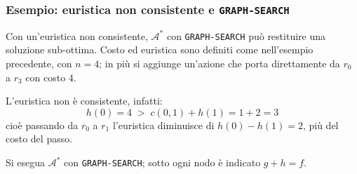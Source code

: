 \documentclass[a4paper, 11pt, oneside]{book}
\theoremstyle{definition}
\begin{document}
    \subsubsection*{Esempio: euristica non consistente e \texttt{GRAPH-SEARCH}}
    Con un'euristica non consistente, $\mathcal{A}^*$ con \texttt{GRAPH-SEARCH} pu\`o
    restituire una soluzione sub-ottima. Costo ed euristica sono definiti come
    nell'esempio precedente, con $n = 4$; in pi\`u si aggiunge un'azione che porta direttamente
    da $r_0$ a $r_3$ con costo 4.

    \begin{center}
    \end{center}

    L'euristica non \`e consistente, infatti:
    \[
        h(0) = 4 \;>\; c(0, 1) + h(1) = 1 + 2 = 3
    \]
    cio\`e passando da $r_0$ a $r_1$ l'euristica diminuisce di $h(0) - h(1) = 2$, pi\`u del
    costo del passo.

    Si esegua $\mathcal{A}^*$ con \texttt{GRAPH-SEARCH}; sotto ogni nodo \`e indicato
    $g + h = f$.
\end{document}
